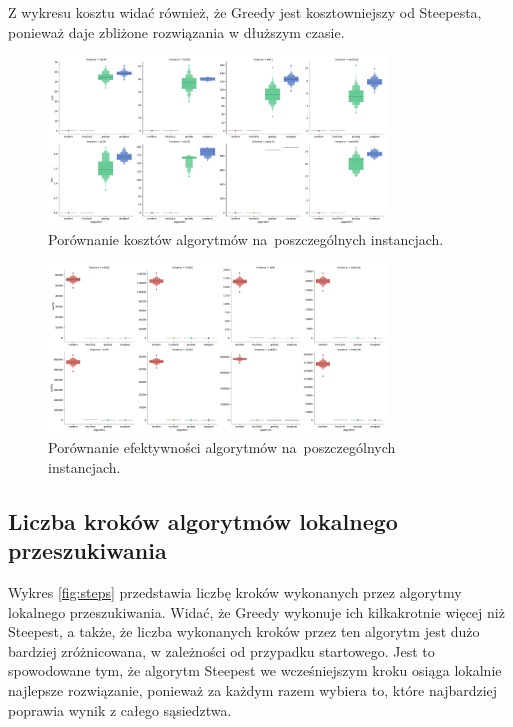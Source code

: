 Z wykresu kosztu widać również, że Greedy jest kosztowniejszy od Steepesta, ponieważ daje zbliżone rozwiązania w dłuższym czasie.

\begin{figure}
\begin{center}
\includegraphics[width=0.8\textwidth]{graphs/cost_comparison_letval.pdf}
\end{center}
\caption{Porównanie kosztów algorytmów na~poszczególnych instancjach.}
\label{fig:cost}
\end{figure}

\begin{figure}
\begin{center}
\includegraphics[width=0.8\textwidth]{graphs/quality_comparison_letval.pdf}
\end{center}
\caption{Porównanie efektywności algorytmów na~poszczególnych instancjach.}
\label{fig:quality}
\end{figure}

\subsection{Liczba kroków algorytmów lokalnego przeszukiwania}

Wykres \ref{fig:steps} przedstawia liczbę kroków wykonanych przez algorytmy lokalnego przeszukiwania. Widać, że Greedy wykonuje ich kilkakrotnie więcej niż Steepest, a także, że liczba wykonanych kroków przez ten algorytm jest dużo bardziej zróżnicowana, w zależności od przypadku startowego. Jest to spowodowane tym, że algorytm Steepest we wcześniejszym kroku osiąga lokalnie najlepsze rozwiązanie, ponieważ za każdym razem wybiera to, które najbardziej poprawia wynik z całego sąsiedztwa.

